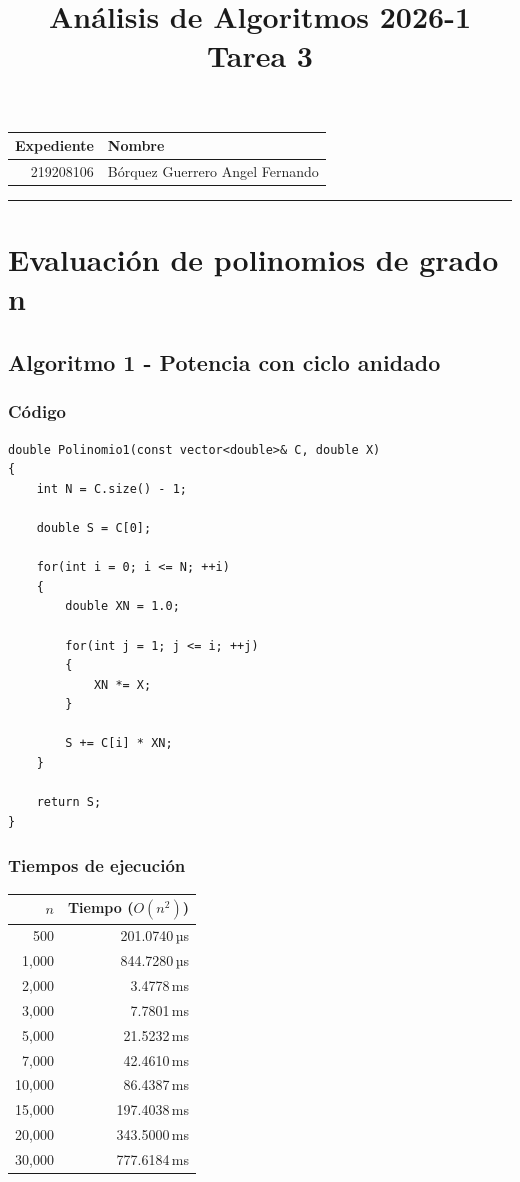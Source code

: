 \documentclass[a4paper, 11pt]{article}
\title
{
    Análisis de Algoritmos 2026-1 \\
    Tarea 3
}
\begin{document}
\maketitle

\begin{center}
    \begin{tabular}{r|l}
        \textbf{Expediente} & \textbf{Nombre} \\ \hline
        219208106 & Bórquez Guerrero Angel Fernando \\
    \end{tabular}
\end{center}

\rule{\linewidth}{0.3mm}

\vspace{0.3cm}
\section{Evaluación de polinomios de grado n}
\subsection{Algoritmo 1 - Potencia con ciclo anidado}
\subsubsection{Código}
\begin{lstlisting}
double Polinomio1(const vector<double>& C, double X)
{
    int N = C.size() - 1;

    double S = C[0];

    for(int i = 0; i <= N; ++i)
    {
        double XN = 1.0;

        for(int j = 1; j <= i; ++j)
        {
            XN *= X;
        }

        S += C[i] * XN;
    }

    return S;
}
\end{lstlisting}

\newpage
\subsubsection{Tiempos de ejecución}
\begin{table}[ht]
  \centering
  \begin{tabular}{rr}
    \toprule
    $n$ & Tiempo ($O(n^2)$) \\
    \midrule
    500 & 201.0740\,µs \\
    1,000 & 844.7280\,µs \\
    2,000 & 3.4778\,ms \\
    3,000 & 7.7801\,ms \\
    5,000 & 21.5232\,ms \\
    7,000 & 42.4610\,ms \\
    10,000 & 86.4387\,ms \\
    15,000 & 197.4038\,ms \\
    20,000 & 343.5000\,ms \\
    30,000 & 777.6184\,ms \\
    \bottomrule
  \end{tabular}
\end{table}
\end{document}
